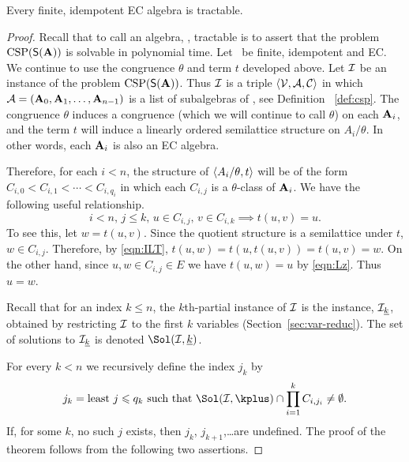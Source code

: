 \begin{theorem}\label{thm:least-block}
Every finite, idempotent EC algebra is tractable.
\end{theorem}

\begin{proof}
Recall that to call an algebra, \bA, tractable is to assert that the problem $\operatorname{CSP}(\mathsf{S}(\mathbf{A}))$ 
is solvable in polynomial time. Let  \bA\ be finite, idempotent and EC. We continue to 
use the congruence $\theta$ and term $t$ developed above. Let $\mathcal{I}$ be an instance of the 
problem $\operatorname{CSP}(\mathsf{S}(\mathbf{A}))$. Thus $\mathcal{I}$ is a triple $\langle\mathcal{V},\mathcal{A},\mathcal{C}\rangle$ in which 
$\mathcal{A}=(\mathbf{A}_0, \mathbf{A}_1,\dots,\mathbf{A}_{n-1})$ is a list of subalgebras of \bA, see Definition~
\ref{def:csp}.  The congruence $\theta$ induces a congruence (which we will continue to call $
\theta$) on each $\mathbf{A}_i$, and the term $t$ will induce a linearly ordered semilattice structure 
on $A_i/\theta$. In other words, each $\mathbf{A}_i$ is also an EC algebra.

Therefore, for each $i<n$, the structure of $\langle A_i/\theta,t\rangle$ will be of the form $C_{i,0} < C_{i,
1} < \cdots < C_{i,q_i}$ in which each $C_{i,j}$ is a $\theta$-class of $\mathbf{A}_i$. We have the 
following useful relationship.
\begin{equation}\label{eqn:almost-meet}
i<n,\, j\leq k,\, u\in C_{i,j},\, v\in C_{i,k} \implies   t(u,v) = u.
\end{equation}
To see this, let $w=t(u,v)$. Since the quotient structure is a semilattice under $t$, $w\in 
C_{i,j}$. Therefore, by \eqref{eqn:ILT}, $t(u,w)=t(u,t(u,v)) = t(u,v) = w$. On the other hand, 
since $u,w \in C_{i,j} \in E$ we have $t(u,w)=u$ by \eqref{eqn:Lz}. Thus $u=w$. 

 Recall that for an index $k\leq n$, the 
$k$th-partial instance of $\mathcal{I}$ is the instance, $\mathcal{I}_{\underline{k}}$, obtained by restricting $\mathcal{I}$ to the first $k$ variables 
(Section~\ref{sec:var-reduc}). 
The set of solutions to $\mathcal{I}_{\underline{k}}$ is denoted $\Sol(\sI,\kk)$.

For every $k < n$ we recursively define the index $j_k$ by
\begin{equation*}
j_k = \text{least  $j\leq q_k$ such that $\Sol(\sI,\kplus)\cap 
   \prod_{i=1}^k C_{i,j_i} \neq \emptyset$.}
\end{equation*}
If, for some $k$, no such $j$ exists, then $j_k$, $j_{k+1}$,\dots are undefined. The proof 
of the theorem follows from the following two assertions.


\end{proof}
